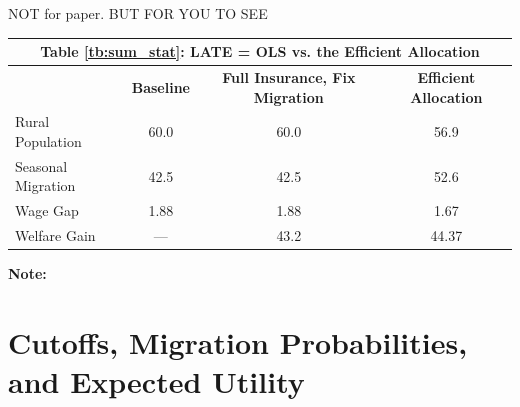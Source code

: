 \documentclass[12pt,pdftex]{article}
\renewcommand{\arraystretch}{1.1}
\begin{document}
\begin{onehalfspacing}
NOT for paper. BUT FOR YOU TO SEE

\begin{table}[t!]
\small
\setlength {\tabcolsep}{1.5mm}
\renewcommand{\arraystretch}{2.30}
\begin{center}\label{tb:effecient}
\begin{tabular}{l c c c }
\multicolumn{4}{c}{\normalsize \textbf{Table \ref{tb:sum_stat}: LATE = OLS vs. the Efficient Allocation}}\\
\hline
\hline
\footnotesize   & \footnotesize  \textbf{Baseline} & \footnotesize   \textbf{Full Insurance, Fix Migration} &  \footnotesize \textbf{Efficient Allocation} \\
\cmidrule(lr){2-2} \cmidrule(lr){3-3} \cmidrule(lr){4-4}
\footnotesize  Rural Population  & 60.0  & 60.0   & 56.9      \\
\footnotesize  Seasonal Migration & 42.5   & 42.5 & 52.6 \\
\footnotesize  Wage Gap  & 1.88  & 1.88  & 1.67     \\
\footnotesize Welfare Gain & --- & 43.2 & 44.37 \\
\hline
\end{tabular}
\parbox[c]{6.75in}{\vspace{.1cm}
{\footnotesize \textbf{Note:} }}
\end{center}
\end{table}


\newpage



\newpage

\appendix

\section{Cutoffs, Migration Probabilities, and Expected Utility}\label{appendix:migration_probs}




\end{onehalfspacing}
\end{document}
